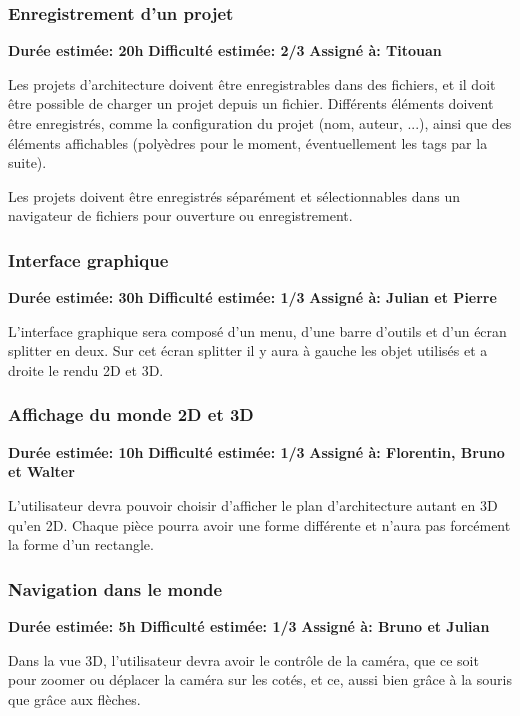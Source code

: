 \subsubsection{Enregistrement d'un projet}

\textbf{Durée estimée: 20h} \textbf{Difficulté estimée: 2/3} \textbf{Assigné à: Titouan}

Les projets d'architecture doivent être enregistrables dans des fichiers, et il doit être possible de charger un projet depuis un fichier. Différents éléments doivent être enregistrés, comme la configuration du projet (nom, auteur, ...), ainsi que des éléments affichables (polyèdres pour le moment, éventuellement les tags par la suite).

Les projets doivent être enregistrés séparément et sélectionnables dans un navigateur de fichiers pour ouverture ou enregistrement.
\subsubsection{Interface graphique}

\textbf{Durée estimée: 30h} \textbf{Difficulté estimée: 1/3} \textbf{Assigné à: Julian et Pierre}

L'interface graphique sera composé d'un menu, d'une barre d'outils et d'un écran splitter en deux. Sur cet écran splitter il y aura à gauche les objet utilisés et a droite le rendu 2D et 3D.
\subsubsection{Affichage du monde 2D et 3D}

\textbf{Durée estimée: 10h} \textbf{Difficulté estimée: 1/3} \textbf{Assigné à: Florentin, Bruno et Walter}

L'utilisateur devra pouvoir choisir d'afficher le plan d'architecture autant en 3D qu'en 2D. Chaque pièce pourra avoir une forme différente et n'aura pas forcément la forme d'un rectangle.
\subsubsection{Navigation dans le monde}

\textbf{Durée estimée: 5h} \textbf{Difficulté estimée: 1/3} \textbf{Assigné à: Bruno et Julian}

Dans la vue 3D, l'utilisateur devra avoir le contrôle de la caméra, que ce soit pour zoomer ou déplacer la caméra sur les cotés, et ce, aussi bien grâce à la souris que grâce aux flèches.
